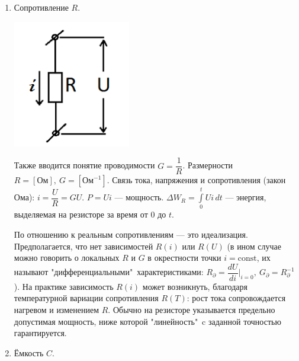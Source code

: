 \documentclass[../main/main.tex]{subfiles}
\begin{document}
\begin{enumerate}
    \item Сопротивление $R$.
    
\begin{minipage}{6cm}
\centering
\includegraphics[scale=0.7]{../section01/images/resistor/resistor.png} %
\end{minipage} \hfill   
\begin{minipage}{11cm}
Также вводится понятие проводимости $G = \dfrac{1}{R}$. Размерности $R = [\text{Ом}],~G = [\text{Ом}^{-1}]$. Связь тока, напряжения и сопротивления (закон Ома): $i=\dfrac{U}{R}=GU$. $P=Ui$ --- мощность. $\Delta W_R = \displaystyle \int \limits_{0}^{t} Ui \, dt$ --- энергия, выделяемая на резисторе за время от $0$ до $t$.
\end{minipage}
    
    По отношению к реальным сопротивлениям --- это идеализация. Предполагается, что нет зависимостей $R(i)$ или $R(U)$ (в ином случае можно говорить о локальных $R$ и $G$ в окрестности точки $i = \text{const}$, их называют "дифференциальными"\ характеристиками: $R_\partial = \dfrac{dU}{di}\bigg|_{i=0},~G_\partial = R_\partial^{-1}$). На практике зависимость $R(i)$ может возникнуть, благодаря температурной вариации сопротивления $R(T)$: рост тока сопровождается нагревом и изменением $R$. Обычно на резисторе указывается предельно допустимая мощность, ниже которой "линейность"\ c заданной точностью гарантируется.
    
    \item Ёмкость $C$. 


\end{enumerate}
\end{document}
